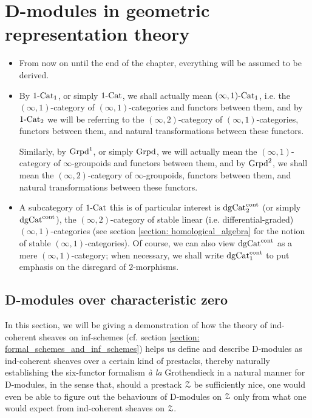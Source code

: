 \chapter{D-modules in geometric representation theory}
    \begin{abstract}
        
    \end{abstract}
    
    \minitoc
    
    \begin{convention} \label{conv: D_modules_everything_is_derived}
        \noindent
        \begin{itemize}
            \item From now on until the end of the chapter, everything will be assumed to be derived. 
            \item By $1\text{-}\mathrm{Cat}_1$, or simply $1\text{-}\mathrm{Cat}$, we shall actually mean $(\infty, 1)\text{-}\mathrm{Cat}_1$, i.e. the $(\infty, 1)$-category of $(\infty, 1)$-categories and functors between them, and by $1\text{-}\mathrm{Cat}_2$ we will be referring to the $(\infty, 2)$-category of $(\infty, 1)$-categories, functors between them, and natural transformations between these functors. 
            
            Similarly, by $\mathrm{Grpd}^1$, or simply $\mathrm{Grpd}$, we will actually mean the $(\infty, 1)$-category of $\infty$-groupoids and functors between them, and by $\mathrm{Grpd}^2$, we shall mean the $(\infty, 2)$-category of $\infty$-groupoids, functors between them, and natural transformations between these functors.
            \item A subcategory of $1\text{-}\mathrm{Cat}$ this is of particular interest is $\mathrm{dg}\mathrm{Cat}^{\mathrm{cont}}_2$ (or simply $\mathrm{dg}\mathrm{Cat}^{\mathrm{cont}}$), the $(\infty, 2)$-category of stable linear (i.e. differential-graded) $(\infty, 1)$-categories (see section \ref{section: homological_algebra} for the notion of stable $(\infty, 1)$-categories). Of course, we can also view $\mathrm{dg}\mathrm{Cat}^{\mathrm{cont}}$ as a mere $(\infty, 1)$-category; when necessary, we shall write $\mathrm{dg}\mathrm{Cat}^{\mathrm{cont}}_1$ to put emphasis on the disregard of $2$-morphisms.
        \end{itemize} 
    \end{convention}
    
    \section{D-modules over characteristic zero} \label{section: D_modules_over_characteristic_0}
        In this section, we will be giving a demonstration of how the theory of ind-coherent sheaves on inf-schemes (cf. section \ref{section: formal_schemes_and_inf_schemes}) helps us define and describe D-modules as ind-coherent sheaves over a certain kind of prestacks, thereby naturally establishing the six-functor formalism \textit{\`a la} Grothendieck in a natural manner for D-modules, in the sense that, should a prestack $\mathcal{Z}$ be sufficiently nice, one would even be able to figure out the behaviours of D-modules on $\mathcal{Z}$ only from what one would expect from ind-coherent sheaves on $\mathcal{Z}$. 
        
